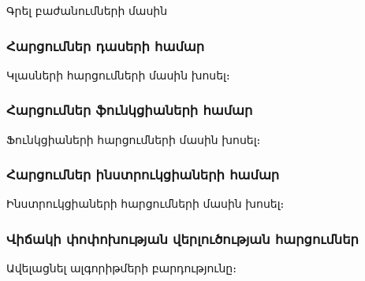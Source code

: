 {
    Գրել բաժանումների մասին

    \subsubsection*{Հարցումներ դասերի համար}\label{subsubsec:classes}
    Կլասների հարցումների մասին խոսել։

    \subsubsection*{Հարցումներ ֆունկցիաների համար}\label{subsubsec:functions}
    Ֆունկցիաների հարցումների մասին խոսել։

    \subsubsection*{Հարցումներ ինստրուկցիաների համար}\label{subsubsec:instructions}
    Ինստրուկցիաների հարցումների մասին խոսել։

    \subsubsection*{Վիճակի փոփոխության վերլուծության հարցումներ}\label{subsubsec:taintAnalisys}
    Ավելացնել ալգորիթմերի բարդությունը։
}